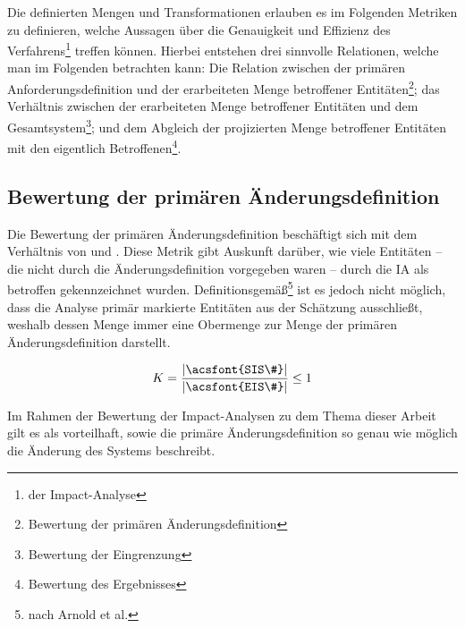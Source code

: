     \pagebreak
    \noindent
    Die definierten Mengen und Transformationen erlauben es im Folgenden Metriken zu definieren, welche Aussagen über die Genauigkeit und Effizienz des Verfahrens\footnote{der Impact-Analyse} treffen können.
    Hierbei entstehen drei sinnvolle Relationen, welche man im Folgenden betrachten kann:
    Die Relation zwischen der primären Anforderungsdefinition und der erarbeiteten Menge betroffener Entitäten\footnote{Bewertung der primären Änderungsdefinition}; das Verhältnis zwischen der erarbeiteten Menge betroffener Entitäten und dem Gesamtsystem\footnote{Bewertung der Eingrenzung}; und dem Abgleich der projizierten Menge betroffener Entitäten mit den eigentlich Betroffenen\footnote{Bewertung des Ergebnisses}.

    
\subsection{Bewertung der primären Änderungsdefinition}
    
    Die Bewertung der primären Änderungsdefinition beschäftigt sich mit dem Verhältnis von  und . 
    Diese Metrik gibt Auskunft darüber, wie viele Entitäten -- die nicht durch die Änderungsdefinition vorgegeben waren -- durch die \ac{IA} als betroffen gekennzeichnet wurden.
    Definitionsgemäß\footnote{nach Arnold et al.} ist es jedoch nicht möglich, dass die Analyse primär markierte Entitäten aus der Schätzung ausschließt, weshalb dessen Menge immer eine Obermenge zur Menge der primären Änderungsdefinition darstellt.
    
    $$
        K = \dfrac{|\text{\acsfont{SIS\#}}|}{|\text{\acsfont{EIS\#}}|} \leq 1
    $$
    
    Im Rahmen der Bewertung der Impact-Analysen zu dem Thema dieser Arbeit gilt es als vorteilhaft, sowie die primäre Änderungsdefinition so genau wie möglich die Änderung des Systems beschreibt. 
    
    
    

